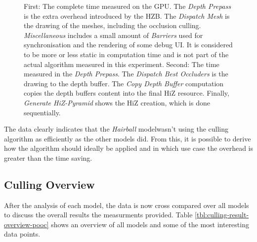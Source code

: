 \begin{figure}[!htb]
  \caption{First: The complete time measured on the \ac{GPU}. The \emph{Depth Prepass} is the extra overhead 
  introduced by the \ac{HZB}. The \emph{Dispatch Mesh} is the drawing of the meshes, including the occlusion 
  culling. \emph{Miscellaneous} includes a small amount of \emph{Barriers} used for synchronisation and the 
  rendering of some debug \ac{UI}. It is considered to be more or less static in computation time and is not 
  part of the actual algorithm measured in this experiment. Second: The time measured in the \emph{Depth Prepass}. 
  The \emph{Dispatch Best Occluders} is the drawing to the depth buffer. The \emph{Copy Depth Buffer} computation 
  copies the depth buffers content into the final \ac{HiZ} resource. Finally, \emph{Generate HiZ-Pyramid} shows 
  the \ac{HiZ} creation, which is done sequentially.}
\end{figure}

\noindent
The data clearly indicates that the \emph{Hairball} modelwasn't using the culling algorithm as efficiently as 
the other models did. From this, it is possible to derive how the algorithm should ideally be applied and in 
which use case the overhead is greater than the time saving.




\subsection*{Culling Overview}

After the analysis of each model, the data is now cross compared over all models to discuss the 
overall results the measurments provided. Table \ref{tbl:culling-result-overview-pooc} shows an overview of 
all models and some of the most interesting data points. 

